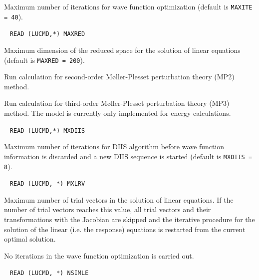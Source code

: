 \begin{description}
  Maximum number of iterations for wave function optimization 
  (default is \verb+MAXITE = 40+).
 
\item[\Key{MAXRED}] \verb| |\newline 
  \verb|READ (LUCMD,*) MAXRED|

  Maximum dimension of the reduced space for the 
  solution of linear equations (default is \verb+MAXRED = 200+).
 
%
%
\item[\Key{MP2}]    
Run calculation for second-order M{\o}ller-Plesset perturbation theory
(MP2) method.

\item[\Key{MP3}]    
Run calculation for third-order M{\o}ller-Plesset perturbation theory
(MP3) method.
The model is currently only implemented for energy calculations.

\item[\Key{MXDIIS}] \verb| |\newline
  \verb|READ (LUCMD,*) MXDIIS|

  Maximum number of iterations for DIIS algorithm
  before wave function information is discarded and a new DIIS 
  sequence is started
  (default is \verb+MXDIIS = 8+).
 
\item[\Key{MXLRV}] \verb| |\newline
  \verb|READ (LUCMD, *) MXLRV|

  Maximum number of trial vectors in the solution of 
  linear equations. If the number of trial vectors reaches this
  value, all trial vectors and their transformations with the
  Jacobian are skipped and the iterative procedure for the solution of the
  linear (i.e. the response) equations is restarted from the current 
  optimal solution. 
 
\item[\Key{NOCCIT}]
   No iterations in the wave function optimization is carried out.

\item[\Key{NSIMLE}] \verb| |\newline
  \verb|READ (LUCMD, *) NSIMLE|


\end{description}
